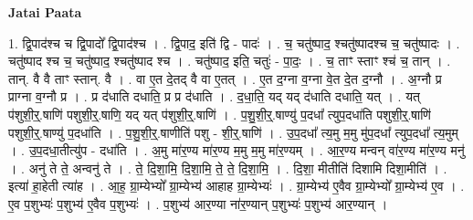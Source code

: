 \documentclass[17pt]{extarticle}
\begin{document}
\textbf{Jatai Paata} \newline

1. द्वि॒पाद॑श्च च द्वि॒पादो᳚ द्वि॒पाद॑श्च । . द्वि॒पाद॒ इति॑ द्वि - पादः॑ । . च॒ चतु॑ष्पाद॒ श्चतु॑ष्पादश्च च॒ चतु॑ष्पादः । . चतु॑ष्पाद श्च च॒ चतु॑ष्पाद॒ श्चतु॑ष्पाद श्च । . चतु॑ष्पाद॒ इति॒ चतुः॑ - पा॒दः॒ । . च॒ ताꣳ स्ताꣳ श्च॑ च॒ तान् । . तान्. वै वै ताꣳ स्तान्. वै । . वा ए॒त दे॒तद् वै वा ए॒तत् । . ए॒त द॒ग्ना व॒ग्ना वे॒त दे॒त द॒ग्नौ । . अ॒ग्नौ प्र प्राग्ना व॒ग्नौ प्र । . प्र द॑धाति दधाति॒ प्र प्र द॑धाति । . द॒धा॒ति॒ यद् यद् द॑धाति दधाति॒ यत् । . यत् प॑शुशी॒र्॒.षाणि॑ पशुशी॒र्॒.षाणि॒ यद् यत् प॑शुशी॒र्॒.षाणि॑ । . प॒शु॒शी॒र्॒.षाण्यु॑ प॒दधा᳚ त्युप॒दधा॑ति पशुशी॒र्॒.षाणि॑ पशुशी॒र्॒.षाण्यु॑ प॒दधा॑ति । . प॒शु॒शी॒र्॒.षाणीति॑ पशु - शी॒र्॒.षाणि॑ । . उ॒प॒दधा᳚ त्य॒मु म॒मु मु॑प॒दधा᳚ त्युप॒दधा᳚ त्य॒मुम् । . उ॒प॒दधा॒तीत्यु॑प - दधा॑ति । . अ॒मु मा॑र॒ण्य मा॑र॒ण्य म॒मु म॒मु मा॑र॒ण्यम् । . आ॒र॒ण्य मन्वन् वा॑र॒ण्य मा॑र॒ण्य मनु॑ । . अनु॑ ते ते॒ अन्वनु॑ ते । . ते॒ दि॒शा॒मि॒ दि॒शा॒मि॒ ते॒ ते॒ दि॒शा॒मि॒ । . दि॒शा॒ मीतीति॑ दिशामि दिशा॒मीति॑ । . इत्या॑ हा॒हेती त्या॑ह । . आ॒ह॒ ग्रा॒म्येभ्यो᳚ ग्रा॒म्येभ्य॑ आहाह ग्रा॒म्येभ्यः॑ । . ग्रा॒म्येभ्य॑ ए॒वैव ग्रा॒म्येभ्यो᳚ ग्रा॒म्येभ्य॑ ए॒व । . ए॒व प॒शुभ्यः॑ प॒शुभ्य॑ ए॒वैव प॒शुभ्यः॑ । . प॒शुभ्य॑ आर॒ण्या ना॑र॒ण्यान् प॒शुभ्यः॑ प॒शुभ्य॑ आर॒ण्यान् । \newline
\end{document}
